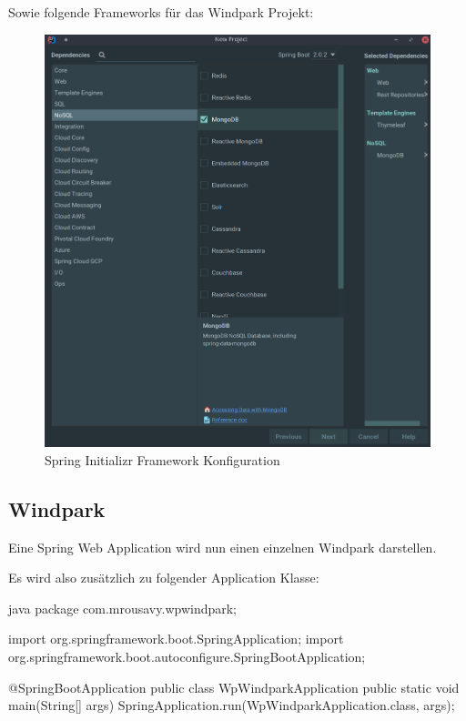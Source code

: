 Sowie folgende Frameworks für das Windpark Projekt:

\begin{figure}
    \caption{Spring Initializr Framework Konfiguration}
    \includegraphics[width=15cm]{images/initializr-frameworks}
    \centering
\end{figure}

\clearpage
\subsection{Windpark}

Eine Spring Web Application wird nun einen einzelnen Windpark darstellen.

Es wird also zusätzlich zu folgender Application Klasse:

\begin{code}{java}
    package com.mrousavy.wpwindpark;

    import org.springframework.boot.SpringApplication;
    import org.springframework.boot.autoconfigure.SpringBootApplication;

    @SpringBootApplication
    public class WpWindparkApplication {
        public static void main(String[] args) {
            SpringApplication.run(WpWindparkApplication.class, args);
        }
    }
\end{code}

